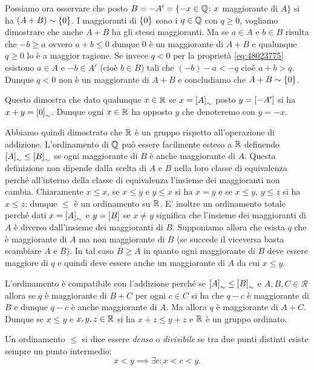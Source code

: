 Possiamo ora osservare che posto $B=-A' = \{-x\in {\mathbb Q} \colon x$ maggiorante di $A\}$
si ha $(A+B)\sim{\left\{ 0 \right\}}$. 
I maggioranti di ${\left\{ 0 \right\}}$ sono i $q\in {\mathbb Q}$ con $q\ge 0$, 
vogliamo dimostrare che anche $A+B$ ha gli stessi maggioranti.
Ma se $a\in A$ e $b\in B$ risulta che $-b\ge a$ ovvero $a+b\le 0$ 
dunque $0$ è un maggiorante di $A+B$ e qualunque $q\ge 0$ lo è a maggior ragione.
Se invece $q<0$ per la proprietà \eqref{eq:48023775} esistono $a\in A$ 
e $-b\in A'$ (cioè $b\in B$) tali che $(-b)-a<-q$ cioè $a+b>q$. Dunque 
$q<0$ non è un maggiorante di $A+B$ e concludiamo che $A+B\sim{\left\{ 0 \right\}}$.

Questo dimostra che dato qualunque $x\in {\mathbb R}$ se $x={\left[ A \right]}_\sim$
posto $y={\left[ -A' \right]}$ si ha $x+y={\left[ 0 \right]}_\sim$.
Dunque ogni $x\in {\mathbb R}$ ha opposto $y$ che denoteremo 
con $y=-x$.

Abbiamo quindi dimostrato che ${\mathbb R}$ è un gruppo rispetto all'operazione 
di addizione. L'ordinamento di ${\mathbb Q}$ può essere facilmente esteso a ${\mathbb R}$
definendo ${\left[ A \right]}_\sim \le {\left[ B \right]}_\sim$ se ogni maggiorante di $B$ 
è anche maggiorante di $A$. Questa definizione non dipende dalla scelta 
di $A$ e $B$ nella loro classe di equivalenza perché all'interno della classe di 
equivalenza l'insieme dei maggioranti 
non cambia.
Chiaramente $x\le x$, se $x\le y$ e $y\le x$ si ha $x=y$ 
e se $x\le y$, $y\le z$ si ha $x\le z$: dunque $\le$ è un ordinamento su ${\mathbb R}$.
E' inoltre un ordinamento totale perché dati $x={\left[ A \right]}_\sim$ e 
$y={\left[ B \right]}$ se $x\neq y$ significa che l'insieme dei maggioranti 
di $A$ è diverso dall'insieme dei maggioranti di $B$. 
Supponiamo allora che esista $q$ che è maggiorante di $A$ 
ma non maggiorante di $B$ (se succede il viceversa basta scambiare $A$ e $B$).
In tal caso $B\ge A$ in quanto ogni maggiorante di $B$ deve essere maggiore 
di $q$ e quindi deve essere anche un maggiorante di $A$ da cui $x\le y$. 

L'ordinamento è compatibile con l'addizione perché se ${\left[ A \right]}_\sim 
\le {\left[ B \right]}_\sim$ e $A,B,C\in \mathcal R$ 
allora se $q$ è maggiorante di $B+C$ per ogni $c\in C$ si ha che $q-c$ 
è maggiorante di $B$ e dunque $q-c$ è anche maggiorante di $A$.
Ma allora $q$ è maggiorante di $A+C$. Dunque se $x\le y$ e $x,y,z\in {\mathbb R}$ 
si ha $x+z\le y+z$ e ${\mathbb R}$ è un gruppo ordinato.

\begin{definition}
  \label{def:ordinamento_denso}%
  Un ordinamento $\le$ si dice essere
  \emph{denso}%
%
 o \emph{divisibile} 
  se tra due punti distinti esiste sempre un punto intermedio:
  \[
   x < y \implies \exists c \colon x < c < y.
  \]
\end{definition}
  
